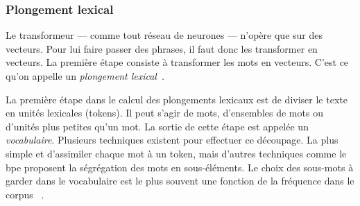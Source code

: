 \subsubsection{Plongement lexical}

Le transformeur --- comme tout réseau de neurones --- n'opère que sur des vecteurs.
Pour lui faire passer des phrases, il faut donc les transformer en vecteurs.
La première étape consiste à transformer les mots en vecteurs.
C'est ce qu'on appelle un \emph{plongement lexical}~\cite{Almeida_Xexéo_2019}.

La première étape dans le calcul des plongements lexicaux est de diviser le texte en unités lexicales (tokens).
Il peut s'agir de mots, d'ensembles de mots ou d'unités plus petites qu'un mot.
La sortie de cette étape est appelée un \emph{vocabulaire}.
Plusieurs techniques existent pour effectuer ce découpage. 
La plus simple et d'assimiler chaque mot à un token,
mais d'autres techniques comme le \gls{bpe} proposent la ségrégation des mots en sous-éléments.
Le choix des sous-mots à garder dans le vocabulaire est le plus souvent une fonction de la fréquence dans le corpus%
~\cite{Rai_Borah_2021}.

